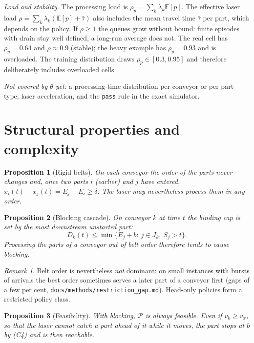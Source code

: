 \documentclass[11pt,a4paper]{article}
\newtheorem{proposition}{Proposition}
\theoremstyle{definition}
\theoremstyle{remark}
\newtheorem{remark}{Remark}
\newcommand{\Pb}{\mathcal{P}}
\begin{document}
\emph{Load and stability.} The processing load is $\rho_p=\sum_k\lambda_k\mathbb E[p]$.
The effective laser load $\rho=\sum_k\lambda_k(\mathbb E[p]+\bar\tau)$ also includes the
mean travel time $\bar\tau$ per part, which depends on the policy. If $\rho\ge 1$ the
queues grow without bound: finite episodes with drain stay well defined, a long-run
average does not. The real cell has $\rho_p=0.64$ and $\rho\approx0.9$ (stable); the
heavy example has $\rho_p=0.93$ and is overloaded. The training distribution draws
$\rho_p\in[0.3,0.95]$ and therefore deliberately includes overloaded cells.

\emph{Not covered by $\theta$ yet:} a processing-time distribution per conveyor or per
part type, laser acceleration, and the \texttt{pass} rule in the exact simulator.

\section{Structural properties and complexity}

\begin{proposition}[Rigid belts]
On each conveyor the order of the parts never changes and, once two parts $i$ (earlier)
and $j$ have entered, $x_i(t)-x_j(t)=E_j-E_i\ge\delta$. The laser may nevertheless
process them in any order.
\end{proposition}

\begin{proposition}[Blocking cascade]
On conveyor $k$ at time $t$ the binding cap is set by the most downstream unstarted part:
\[
D_k(t)\le\min\{E_j+b:\ j\in J_k,\ S_j>t\}.
\]
Processing the parts of a conveyor out of belt order therefore tends to cause
blocking.
\end{proposition}
\begin{remark}
Belt order is nevertheless \emph{not} dominant: on small instances with bursts of
arrivals the best order sometimes serves a later part of a conveyor first (gaps of a
few per cent, \texttt{docs/methods/restriction\_gap.md}). Head-only policies form a
restricted policy class.
\end{remark}

\begin{proposition}[Feasibility]
With blocking, $\Pb$ is always feasible. Even if $v_k\ge v_x$, so that the laser
cannot catch a part ahead of it while it moves, the part stops at $b$ by (C4) and is
then reachable.
\end{proposition}
\end{document}
